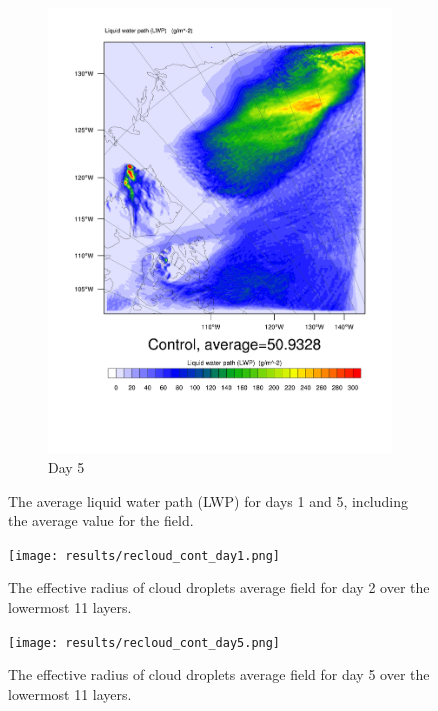 \begin{figure}
\begin{subfigure}{0.48\textwidth}
        \includegraphics[width=\textwidth]{results/LWP_Day5.pdf}
        \caption{Day 5}
        \label{subfig:LWPr1Day5}
    \end{subfigure}
    \caption{The average liquid water path (LWP) for days 1 and 5, including the average value for the field.}
    \label{fig:LWP}
\end{figure}

\begin{figure}[h]
\centering
\texttt{[image: results/recloud\_cont\_day1.png]}
\caption{The effective radius of cloud droplets average field for day 2 over the lowermost 11 layers.}
\label{fig:recloud_r1Day1}
\end{figure}

\begin{figure}[h]
\centering
\texttt{[image: results/recloud\_cont\_day5.png]}
\caption{The effective radius of cloud droplets average field for day 5 over the lowermost 11 layers.}
\label{fig:recloud_r1Day5}
\end{figure}


